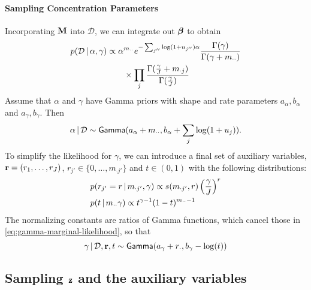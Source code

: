 \paragraph{Sampling Concentration Parameters}
\label{sec:sampling-alpha}
Incorporating $\mathbf{M}$ into $\mathcal{D}$, we can integrate out
$\boldsymbol{\beta}$ to obtain
\begin{align}
\begin{split}
\label{eq:gamma-marginal-likelihood}
  p(\mathcal{D} \, \vert \, \alpha, \gamma) &\propto
  \alpha^{m_{\cdot\cdot}} e^{-\sum_{j''} \log(1+u_{j''}) \alpha}
  \frac{\Gamma(\gamma)}{\Gamma(\gamma + m_{\cdot\cdot})} \\
  & \qquad \times \prod_j
  \frac{\Gamma(\frac{\gamma}{J} + m_{\cdot
      j})}{\Gamma(\frac{\gamma}{J}) }
\end{split}
\end{align}
Assume that $\alpha$ and $\gamma$ have Gamma priors with shape and
rate parameters $a_{\alpha}, b_{\alpha}$ and $a_{\gamma}, b_{\gamma}$.  
Then
\begin{equation}
  \label{eq:alpha-posterior}
  \alpha \, \vert \, \mathcal{D} \sim \mathsf{Gamma}(a_{\alpha}
    + m_{\cdot\cdot},b_\alpha + \sum_j\log(1+u_j)).
\end{equation}
To simplify the likelihood for $\gamma$, we can introduce a final
set of auxiliary variables, $\mathbf{r} = (r_1, \dots,
r_J)$, $r_{j'} \in \{0,\dots,m_{\cdot j'}\}$ and $t \in (0,1)$ with the following distributions:
\begin{align}
  \label{eq:9}
  &p(r_{j'}  = r \, \vert \, m_{\cdot {j'}}, \gamma) \propto s(m_{\cdot {j'}}, r)
    \left(\frac{\gamma}{J}\right)^r \\
  &p(t \, \vert \, m_{\cdot\cdot} \gamma) \propto 
    t^{\gamma - 1} (1-t)^{m_{\cdot\cdot} - 1}
\end{align}
The normalizing constants are ratios of Gamma functions, which cancel
those in \eqref{eq:gamma-marginal-likelihood}, so that
\begin{equation}
  \label{eq:18}
  \gamma \, \vert \, \mathcal{D},\mathbf{r}, t \sim \mathsf{Gamma}(a_{\gamma} + r_{\cdot},b_{\gamma} - \log(t))
\end{equation}

\subsection{Sampling \texorpdfstring{$\mathbf{z}$}{the latent state sequece} and the auxiliary variables}
\label{sec:sampling-z_t}

